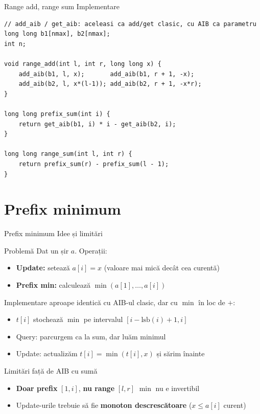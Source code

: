\documentclass[10pt]{beamer}
\begin{document}
\begin{frame}[fragile]{Range add, range sum \textemdash{} Implementare}
  \begin{lstlisting}
// add_aib / get_aib: aceleasi ca add/get clasic, cu AIB ca parametru
long long b1[nmax], b2[nmax];
int n;

void range_add(int l, int r, long long x) {
    add_aib(b1, l, x);       add_aib(b1, r + 1, -x);
    add_aib(b2, l, x*(l-1)); add_aib(b2, r + 1, -x*r);
}

long long prefix_sum(int i) {
    return get_aib(b1, i) * i - get_aib(b2, i);
}

long long range_sum(int l, int r) {
    return prefix_sum(r) - prefix_sum(l - 1);
}
  \end{lstlisting}
\end{frame}

\section{Prefix minimum}

\begin{frame}{Prefix minimum \textemdash{} Idee și limitări}
  \begin{block}{Problemă}
    Dat un șir $a$. Operații:
    \begin{itemize}\itemsep0pt
      \item \textbf{Update:} setează $a[i] = x$ (valoare mai mică decât cea curentă)
      \item \textbf{Prefix min:} calculează $\min(a[1], \ldots, a[i])$
    \end{itemize}
  \end{block}
  \smallskip
  Implementare aproape identică cu AIB-ul clasic, dar cu $\min$ în loc de $+$:
  \begin{itemize}\itemsep0pt
    \item $t[i]$ stochează $\min$ pe intervalul $[i-\text{lsb}(i)+1, i]$
    \item Query: parcurgem ca la sum, dar luăm minimul
    \item Update: actualizăm $t[i] = \min(t[i], x)$ și sărim înainte
  \end{itemize}
  \smallskip
  \begin{alertblock}{Limitări față de AIB cu sumă}
    \begin{itemize}\itemsep0pt
      \item \textbf{Doar prefix} $[1, i]$, \textbf{nu range} $[l, r]$
        \textemdash{} $\min$ nu e invertibil
      \item Update-urile trebuie să fie \textbf{monoton descrescătoare}
        ($x \leq a[i]$ curent)
    \end{itemize}
  \end{alertblock}
\end{frame}
\end{document}
